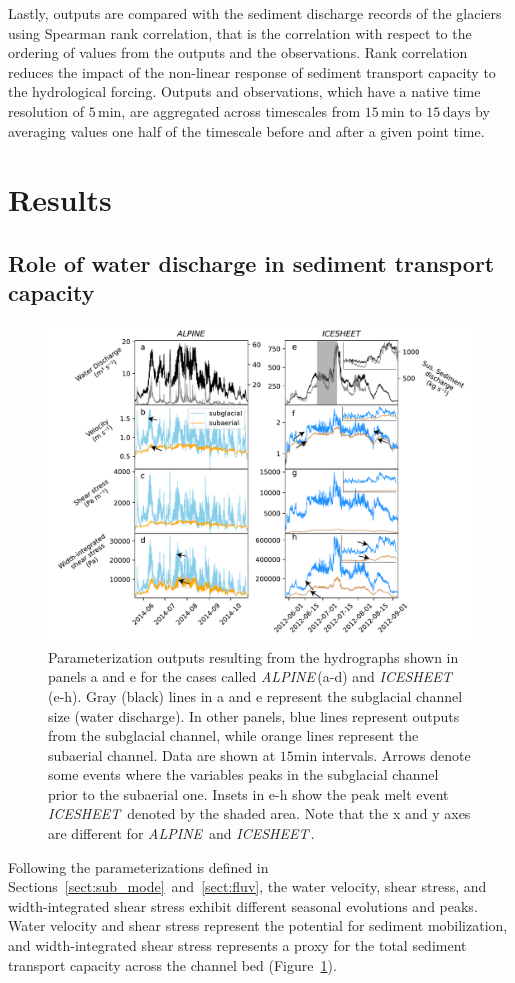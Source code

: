 \documentclass[draft]{agujournal2019}
\newcommand{\alpine}{\textit{ALPINE}\,}
\newcommand{\icesheet}{\textit{ICESHEET}\,}
\newcommand{\unit}[1]{$\mathrm{#1}$}
\begin{document}
Lastly,  outputs are compared with the sediment discharge records of the glaciers using Spearman rank correlation, that is the correlation with respect to the ordering of values from the outputs and the observations.
Rank correlation reduces the impact of the non-linear response of sediment transport capacity to the hydrological forcing.
Outputs and observations, which have a native time resolution of $5$\,\unit{min}, are aggregated across timescales from $15$\,\unit{min} to $15$\,\unit{days} by averaging values one half of the timescale before and after a given point time.


\section{Results}

\subsection{Role of water discharge in sediment transport capacity}
\begin{figure}[h]
  \centering
  \includegraphics[width=0.9\linewidth]{Fig2.pdf}
  \caption{Parameterization outputs resulting from the hydrographs shown in panels a and e for the cases called \alpine (a-d) and \icesheet{} (e-h). Gray (black) lines in a and e represent the subglacial channel size (water discharge).  In other panels, blue lines represent outputs from the subglacial channel, while orange lines represent the subaerial channel.
    Data are shown at $15$\unit{min} intervals.
    Arrows denote some events where the variables peaks in the subglacial channel prior to the subaerial one.
    Insets in e-h show the  peak melt event \icesheet{} denoted by the shaded area.
    Note that the x and y axes are different for \alpine{} and \icesheet{}.
      }
  \label{fig:model_outs}
\end{figure}
Following the parameterizations defined in Sections~\ref{sect:sub_mode}~and~\ref{sect:fluv}, the water velocity, shear stress, and width-integrated shear stress exhibit different seasonal evolutions and peaks. Water velocity and shear stress represent the potential for sediment mobilization, and width-integrated shear stress represents a proxy for the total sediment transport capacity across the channel bed (Figure~\ref{fig:model_outs}).
\end{document}
